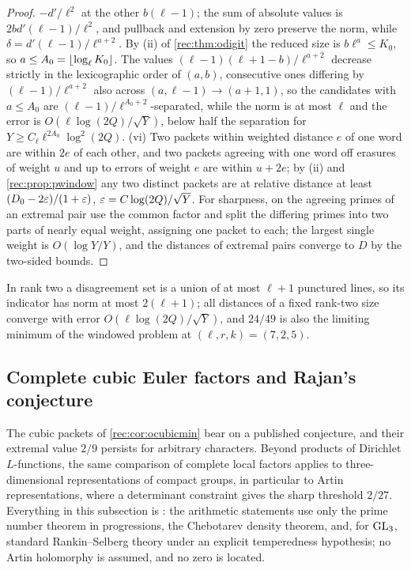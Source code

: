 \begin{proof}
$-d'/\ell^2$ at the other $b(\ell-1)$; the sum of absolute values is $2bd'(\ell-1)/\ell^2$, and pullback and extension by zero
preserve the norm, while $\delta=d'(\ell-1)/\ell^{a+2}$. By (ii) of \cref{rec:thm:odigit} the reduced size is $b\ell^a\le K_0$, so $a\le A_0=\lfloor\log_\ell K_0\rfloor$.
The values $(\ell-1)(\ell+1-b)/\ell^{a+2}$ decrease strictly in the lexicographic order of $(a,b)$, consecutive ones differing by
$(\ell-1)/\ell^{a+2}$ also across $(a,\ell-1)\to(a+1,1)$, so the candidates with $a\le A_0$ are $(\ell-1)/\ell^{A_0+2}$-separated, while the norm is
at most $\ell$ and the error is $O(\ell\log(2Q)/\sqrt Y)$, below half the separation for $Y\ge C_\ell\ell^{2A_0}\log^2(2Q)$.
(vi) Two packets within weighted distance $e$ of one word are within $2e$ of each other, and two packets
agreeing with one word off erasures of weight $u$ and up to errors of weight $e$ are within $u+2e$; by (ii) and
\cref{rec:prop:pwindow} any two distinct packets are at relative distance at least $(D_0-2\varepsilon)/(1+\varepsilon)$, $\varepsilon=C\log(2Q)/\sqrt Y$. For sharpness, on the
agreeing primes of an extremal pair use the common factor and split the differing primes into two parts of
nearly equal weight, assigning one packet to each; the largest single weight is $O(\log Y/Y)$, and the
distances of extremal pairs converge to $D$ by the two-sided bounds.
\end{proof}

In rank two a disagreement set is a union of at most $\ell+1$ punctured lines, so its indicator has norm at most
$2(\ell+1)$; all distances of a fixed rank-two size converge with error $O(\ell\log(2Q)/\sqrt Y)$, and $24/49$ is also the limiting
minimum of the windowed problem at $(\ell,r,k)=(7,2,5)$.

\subsection{Complete cubic Euler factors and Rajan's conjecture}\label{eul:sec:cubic}

The cubic packets of \cref{rec:cor:ocubicmin} bear on a published conjecture, and their extremal value $2/9$
persists for arbitrary characters. Beyond products of Dirichlet $L$-functions, the same comparison of complete
local factors applies to three-dimensional representations of compact groups, in particular to Artin
representations, where a determinant constraint gives the sharp threshold $2/27$. Everything in this subsection is
\stU: the arithmetic statements use only the prime number theorem in progressions, the Chebotarev density theorem,
and, for $\operatorname{GL}_3$, standard Rankin--Selberg theory under an explicit temperedness hypothesis; no Artin holomorphy is
assumed, and no zero is located.

